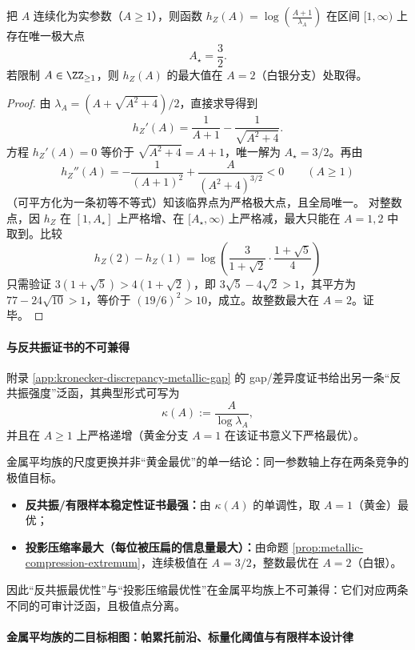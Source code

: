 \begin{proposition}[金属平均族的投影压缩率在 \texorpdfstring{$A=\frac{3}{2}$}{A=3/2} 处取极大]\label{prop:metallic-compression-extremum}
把 $A$ 连续化为实参数（$A\ge 1$），则函数
\(
h_Z(A)=\log\!\left(\frac{A+1}{\lambda_A}\right)
\)
在区间 $[1,\infty)$ 上存在唯一极大点
\[
A_\star=\frac{3}{2}.
\]
若限制 $A\in\ZZ_{\ge 1}$，则 $h_Z(A)$ 的最大值在 $A=2$（白银分支）处取得。
\end{proposition}
\begin{proof}
由 $\lambda_A=(A+\sqrt{A^2+4})/2$，直接求导得到
\[
h_Z'(A)=\frac{1}{A+1}-\frac{1}{\sqrt{A^2+4}}.
\]
方程 $h_Z'(A)=0$ 等价于 $\sqrt{A^2+4}=A+1$，唯一解为 $A_\star=3/2$。再由
\[
h_Z''(A)=-\frac{1}{(A+1)^2}+\frac{A}{(A^2+4)^{3/2}}<0\qquad(A\ge 1)
\]
（可平方化为一条初等不等式）知该临界点为严格极大点，且全局唯一。
对整数点，因 $h_Z$ 在 $[1,A_\star]$ 上严格增、在 $[A_\star,\infty)$ 上严格减，最大只能在 $A=1,2$ 中取到。比较
\[
h_Z(2)-h_Z(1)=\log\!\left(\frac{3}{1+\sqrt2}\cdot\frac{1+\sqrt5}{4}\right)
\]
只需验证
\(
3(1+\sqrt5)>4(1+\sqrt2)
\)，即
\(
3\sqrt5-4\sqrt2>1
\)，其平方为 $77-24\sqrt{10}>1$，等价于 $(19/6)^2>10$，成立。故整数最大在 $A=2$。证毕。
\end{proof}

\paragraph{与反共振证书的不可兼得}
附录 \ref{app:kronecker-discrepancy-metallic-gap} 的 gap/差异度证书给出另一条“反共振强度”泛函，其典型形式可写为
\[
\kappa(A):=\frac{A}{\log\lambda_A},
\]
并且在 $A\ge 1$ 上严格递增（黄金分支 $A=1$ 在该证书意义下严格最优）。

\begin{remark}\label{rem:metallic-dual-optimality}
金属平均族的尺度更换并非“黄金最优”的单一结论：同一参数轴上存在两条竞争的极值目标。
\begin{itemize}
  \item \textbf{反共振/有限样本稳定性证书最强：}由 $\kappa(A)$ 的单调性，取 $A=1$（黄金）最优；
  \item \textbf{投影压缩率最大（每位被压扁的信息量最大）：}由命题 \ref{prop:metallic-compression-extremum}，连续极值在 $A=3/2$，整数最优在 $A=2$（白银）。
\end{itemize}
因此“反共振最优性”与“投影压缩最优性”在金属平均族上不可兼得：它们对应两条不同的可审计泛函，且极值点分离。
\end{remark}

\paragraph{金属平均族的二目标相图：帕累托前沿、标量化阈值与有限样本设计律}

